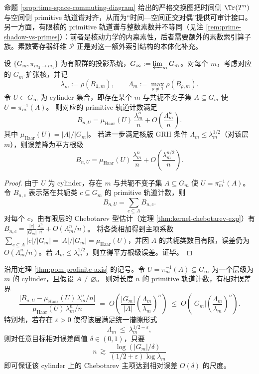 \begin{remark}[时间—空间对偶接口与素数影子]\label{rem:pom-time-space}
命题 \ref{prop:time-space-commuting-diagram} 给出的严格交换图把时间侧 $\Tr(T^n)$ 与空间侧 primitive 轨道谱对齐，从而为“时间—空间正交对偶”提供可审计接口。另一方面，有限核的 primitive 轨道谱与整数素数并不等同（见注 \ref{rem:prime-shadow-vs-primes}）：前者是核动力学的内禀素性，后者需要额外的素数索引算子族。素数寄存器纤维 $\mathcal{P}$ 正是对这一额外索引结构的本体化补充。
\end{remark}

\begin{theorem}\label{thm:pom-profinite-axis}
设 $\{G_m,\pi_{m_2\to m_1}\}$ 为有限群的投影系统，$G_\infty:=\varprojlim_m G_m$。对每个 $m$，考虑对应的 $G_m$-扩张核，并记
$$
\lambda_m:=\rho(B_{\mathbf 1,m}),\qquad
\Lambda_m:=\max_{\rho\neq\mathbf 1}\rho(B_{\rho,m}).
$$
令 \(U\subset G_\infty\) 为 cylinder 集合，即存在某个 $m$ 与共轭不变子集 $A\subseteq G_m$ 使
\(
U=\pi_m^{-1}(A)
\)。
则对应的 primitive 轨道计数满足
$$
B_{n,U}
=\mu_{\mathrm{Haar}}(U)\,\frac{\lambda_m^n}{n}
 +O\!\left(\frac{\Lambda_m^n}{n}\right).
$$
其中 \(\mu_{\mathrm{Haar}}(U)=|A|/|G_m|\)。
若进一步满足核版 GRH 条件 $\Lambda_m\le \lambda_m^{1/2}$（对该层 $m$），则误差降为平方根级
$$
B_{n,U}
=\mu_{\mathrm{Haar}}(U)\,\frac{\lambda_m^n}{n}
 +O\!\left(\frac{\lambda_m^{n/2}}{n}\right).
$$
\end{theorem}
\begin{proof}
由于 $U$ 为 cylinder，存在 $m$ 与共轭不变子集 $A\subseteq G_m$ 使 $U=\pi_m^{-1}(A)$。令 $B_{n,c}$ 表示落在共轭类 $c\subseteq G_m$ 的 primitive 轨道计数，则
$$
B_{n,U}=\sum_{c\subseteq A} B_{n,c}.
$$
对每个 $c$，由有限层的 Chebotarev 型估计（定理 \ref{thm:kernel-chebotarev-exp}）有
$
B_{n,c}=\frac{|c|}{|G_m|}\frac{\lambda_m^n}{n}+O(\Lambda_m^n/n)
$。
将各类相加得到主项系数
$
\sum_{c\subseteq A}|c|/|G_m|=|A|/|G_m|=\mu_{\mathrm{Haar}}(U)
$，并因 $A$ 的共轭类数目有限，误差仍为 $O(\Lambda_m^n/n)$。若 $\Lambda_m\le \lambda_m^{1/2}$，则立得平方根级误差。证毕。
\end{proof}

\begin{corollary}\label{cor:pom-profinite-cylinder-effective-n}
沿用定理 \ref{thm:pom-profinite-axis} 的记号。令 \(U=\pi_m^{-1}(A)\subseteq G_\infty\) 为一个层级为 \(m\) 的 cylinder，且假设 \(A\neq\varnothing\)。
则对长度 \(n\) 的 primitive 轨道计数，有相对误差界
\[
\frac{\bigl|B_{n,U}-\mu_{\mathrm{Haar}}(U)\,\lambda_m^n/n\bigr|}{\mu_{\mathrm{Haar}}(U)\,\lambda_m^n/n}
\;=\;
O\!\left(\frac{|G_m|}{|A|}\left(\frac{\Lambda_m}{\lambda_m}\right)^n\right)
\;\le\;
O\!\left(|G_m|\left(\frac{\Lambda_m}{\lambda_m}\right)^n\right).
\]
特别地，若存在 \(\varepsilon>0\) 使得该层满足统一谱隙形式
\[
\Lambda_m\ \le\ \lambda_m^{1/2-\varepsilon},
\]
则对任意目标相对误差阈值 \(\delta\in(0,1)\)，只要
\[
\boxed{\;
n\ \gtrsim\ \frac{\log(|G_m|/\delta)}{(1/2+\varepsilon)\log \lambda_m}\; }
\]
即可保证该 cylinder 上的 Chebotarev 主项达到相对误差 \(O(\delta)\) 的尺度。
\end{corollary}

